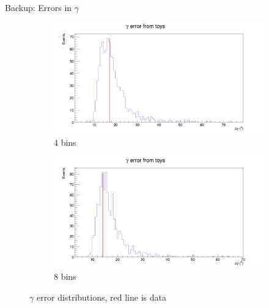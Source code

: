 \documentclass{beamer}
\begin{document}
\begin{frame}{Backup: Errors in $\gamma$}
  \begin{figure}
    \centering
    \vspace{-0.2cm}
    \begin{subfigure}{0.5\textwidth}
      \includegraphics[width = 1.0\textwidth]{GammaError_4Bins.png}
      \caption{$4$ bins}
    \end{subfigure}%
    \begin{subfigure}{0.5\textwidth}
      \includegraphics[width = 1.0\textwidth]{GammaError_8Bins.png}
      \caption{$8$ bins}
    \end{subfigure}
    \caption{$\gamma$ error distributions, red line is data}
  \end{figure}
\end{frame}
\end{document}

